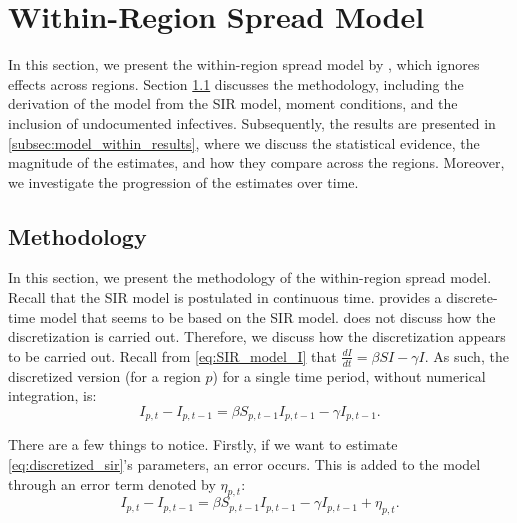 \documentclass[12pt]{article}
\begin{document}
	\section{Within-Region Spread Model} \label{sec:model_within}
	In this section, we present the within-region spread model by \textcite{adda2016economic}, which ignores effects across regions. Section \ref{subsec:model_within_methodology} discusses the methodology, including the derivation of the model from the SIR model, moment conditions, and the inclusion of undocumented infectives. Subsequently, the results are presented in \ref{subsec:model_within_results}, where we discuss the statistical evidence, the magnitude of the estimates, and how they compare across the regions. Moreover, we investigate the progression of the estimates over time.
	
	\subsection{Methodology} \label{subsec:model_within_methodology}
	In this section, we present the methodology of the within-region spread model. Recall that the SIR model is postulated in continuous time. \textcite{adda2016economic} provides a discrete-time model that seems to be based on the SIR model. \textcite{adda2016economic} does not discuss how the discretization is carried out. Therefore, we discuss how the discretization appears to be carried out. Recall from \eqref{eq:SIR_model_I} that $\frac{dI}{dt} = \beta SI - \gamma I$. As such, the discretized version (for a region $p$) for a single time period, without numerical integration, is:
	    \begin{equation}\label{eq:discretized_sir}
	        I_{p,t} - I_{p,t-1} = \beta S_{p,t-1}I_{p,t-1} - \gamma I_{p,t-1}.
	    \end{equation}
	   
	There are a few things to notice. Firstly, if we want to estimate \eqref{eq:discretized_sir}'s parameters, an error occurs. This is added to the model through an error term denoted by $\eta_{p,t}$:
	    \begin{equation}\label{eq:discretized_sir_error}
	        I_{p,t} - I_{p,t-1} = \beta S_{p,t-1}I_{p,t-1} - \gamma I_{p,t-1} + \eta_{p,t}.
	    \end{equation}
	
\end{document}
